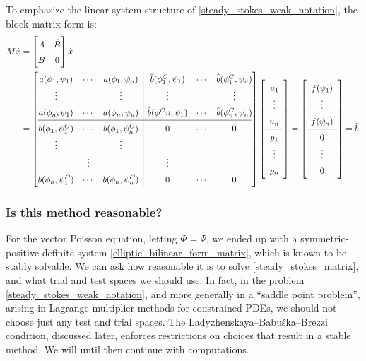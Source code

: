 To emphasize the linear system structure of \eqref{steady_stokes_weak_notation}, the block matrix form is:
\begin{equation}\label{steady_stokes_matrix}
\def\arraystretch{1.5}
\begin{split}
    M\hat{x}
    &= \begin{bmatrix}
            A & \hat{B} \\
            B & 0
    \end{bmatrix}\hat{x} \\
    &= \left[\begin{array}{@{}ccc|ccc@{}}
            a(\phi_1, \psi_1) & \cdots & a(\phi_1, \psi_n)     & \hat{b}(\phi^C_1, \psi_1) & \cdots & \hat{b}(\phi^C_1, \psi_n) \\
            \vdots & & \vdots                                  & \vdots & & \vdots \\
            a(\phi_n, \psi_1) & \cdots & a(\phi_n, \psi_n)     & \hat{b}(\phi^Cn, \psi_1) & \cdots & \hat{b}(\phi^C_n, \psi_n) \\
            \hline
            b(\phi_1, \psi^C_1) & \cdots & b(\phi_1, \psi^C_n) & 0 &\cdots& 0      \\
            \vdots & & \vdots \\                               & \vdots & & \vdots \\
            b(\phi_n, \psi^C_1) & \cdots & b(\phi_n, \psi^C_n) & 0 &\cdots& 0       
    \end{array}\right]
    \left[\begin{array}{c} u_1 \\ \vdots \\ u_n \\ \hline p_1 \\ \vdots \\ p_n \end{array}\right]
    =
    \left[\begin{array}{c} f(\psi_1) \\ \vdots \\ f(\psi_{n}) \\ \hline 0 \\ \vdots \\ 0 \end{array}\right]
    = \hat{b}.
\end{split}
\end{equation}
\subsubsection{Is this method reasonable?}
For the vector Poisson equation, letting $\Phi = \Psi$, we ended up with a symmetric-positive-definite system \eqref{elliptic_bilinear_form_matrix}, which is known to be stably solvable.
We can ask how reasonable it is to solve \eqref{steady_stokes_matrix}, and what trial and test spaces we should use.
In fact, in the problem \eqref{steady_stokes_weak_notation}, and more generally in a ``saddle point problem'', arising
in Lagrange-multiplier methods for constrained PDEs, we should not choose just any test and trial spaces.
The Ladyzhenskaya--Babu\v{s}ka--Brezzi condition, discussed later, enforces restrictions on choices that result in a stable method.
We will until then continue with computations.


